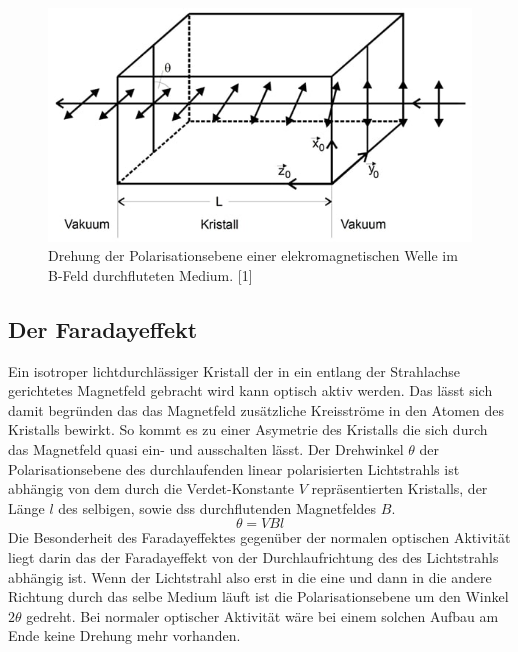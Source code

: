 \begin{figure}
  \centering
  \includegraphics[width=1\textwidth]{content/grafiken/kristall.JPG}
  \caption{Drehung der Polarisationsebene einer elekromagnetischen Welle im B-Feld durchfluteten Medium. [1]}
  \label{fig:kristall}
\end{figure}

\subsection{Der Faradayeffekt}
\label{sec:faradayeffekt}
Ein isotroper lichtdurchlässiger Kristall der in ein entlang der Strahlachse gerichtetes Magnetfeld gebracht wird 
kann optisch aktiv werden. Das lässt sich damit begründen das das Magnetfeld zusätzliche Kreisströme in den Atomen 
des Kristalls bewirkt. So kommt es zu einer Asymetrie des Kristalls die sich durch das Magnetfeld quasi ein- und ausschalten
lässt. Der Drehwinkel $\theta$ der Polarisationsebene des durchlaufenden linear polarisierten Lichtstrahls ist abhängig
von dem durch die Verdet-Konstante $V$ repräsentierten Kristalls, der Länge $l$ des selbigen, sowie dss durchflutenden
Magnetfeldes $B$.
\begin{equation}
  \theta=VBl
\end{equation}
Die Besonderheit des Faradayeffektes gegenüber der normalen optischen Aktivität liegt darin das der Faradayeffekt von der 
Durchlaufrichtung des des Lichtstrahls abhängig ist. Wenn der Lichtstrahl also erst in die eine und dann in die andere Richtung 
durch das selbe Medium läuft ist die Polarisationsebene um den Winkel $2\theta$ gedreht. Bei normaler optischer Aktivität 
wäre bei einem solchen Aufbau am Ende keine Drehung mehr vorhanden.
